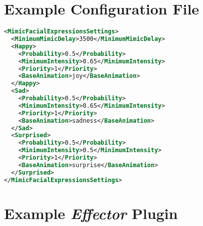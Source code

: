 \chapter{Example Configuration File}
\label{chapter:appendixB}

\vspace{9.5cm}


\begin{lstlisting}[caption={Excerpt of the Facial Expression Mimicry \textit{Effector} configuration file. The final animation is the \texttt{BaseAnimation} appended with a random number between 1 and 5, resulting on, for example, suprise3.},label={lst:facialExpressionsSettings},language=XML]
<MimicFacialExpressionsSettings>
  <MinimumMimicDelay>3500</MinimumMimicDelay>
  <Happy>
    <Probability>0.5</Probability>
    <MinimumIntensity>0.65</MinimumIntensity>
    <Priority>1</Priority>
    <BaseAnimation>joy</BaseAnimation>
  </Happy>
  <Sad>
    <Probability>0.5</Probability>
    <MinimumIntensity>0.65</MinimumIntensity>
    <Priority>1</Priority>
    <BaseAnimation>sadness</BaseAnimation>
  </Sad>
  <Surprised>
    <Probability>0.5</Probability>
    <MinimumIntensity>0.5</MinimumIntensity>
    <Priority>1</Priority>
    <BaseAnimation>surprise</BaseAnimation>
  </Surprised>
</MimicFacialExpressionsSettings>
\end{lstlisting}

\chapter{Example \textit{Effector} Plugin}

\vspace{9.5cm}

